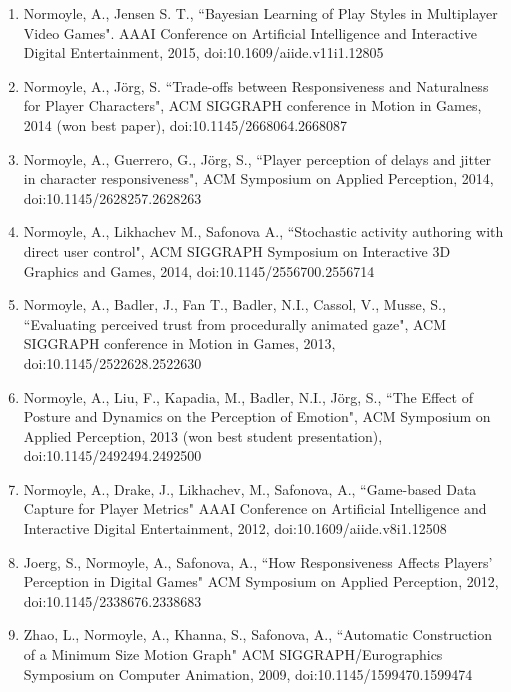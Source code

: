 \begin{enumerate}[leftmargin=*]
\item Normoyle, A., Jensen S. T., ``Bayesian Learning of Play Styles in Multiplayer Video Games". AAAI Conference on Artificial Intelligence and Interactive Digital Entertainment, 2015, doi:10.1609/aiide.v11i1.12805 

\item Normoyle, A., J\"{o}rg, S. ``Trade-offs between Responsiveness and Naturalness for Player Characters", 
ACM SIGGRAPH conference in Motion in Games, 2014 (won best paper), doi:10.1145/2668064.2668087

\item Normoyle, A., Guerrero, G., J\"{o}rg, S., ``Player perception of delays and jitter in character responsiveness", 
ACM Symposium on Applied Perception, 2014, doi:10.1145/2628257.2628263

\item Normoyle, A., Likhachev M., Safonova A., ``Stochastic activity authoring with direct user control", 
ACM SIGGRAPH Symposium on Interactive 3D Graphics and Games, 2014, doi:10.1145/2556700.2556714

\item Normoyle, A., Badler, J., Fan T., Badler, N.I., Cassol, V., Musse, S., ``Evaluating perceived trust from procedurally animated gaze", ACM SIGGRAPH conference in Motion in Games, 2013, doi:10.1145/2522628.2522630

\item Normoyle, A., Liu, F., Kapadia, M., Badler, N.I., J\"{o}rg, S., ``The Effect of Posture and Dynamics on the Perception of Emotion", ACM Symposium on Applied Perception, 2013 (won best student presentation), doi:10.1145/2492494.2492500

\item Normoyle, A., Drake, J., Likhachev, M., Safonova, A., ``Game-based Data Capture for Player Metrics" 
AAAI Conference on Artificial Intelligence and Interactive Digital Entertainment, 2012, doi:10.1609/aiide.v8i1.12508 

\item Joerg, S., Normoyle, A., Safonova, A., ``How Responsiveness Affects Players' Perception in Digital Games" 
ACM Symposium on Applied Perception, 2012, doi:10.1145/2338676.2338683

\item Zhao, L., Normoyle, A., Khanna, S., Safonova, A., ``Automatic Construction of a Minimum Size Motion Graph" ACM SIGGRAPH/Eurographics Symposium on Computer Animation, 2009, doi:10.1145/1599470.1599474


\end{enumerate}
